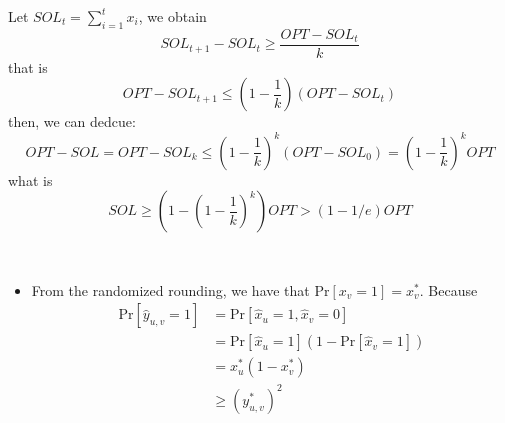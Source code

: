 \documentclass[12pt]{article}
\newenvironment{solution}[2][Solution]{\begin{trivlist}
\item[\hskip \labelsep {\bfseries #1}\hskip \labelsep {\bfseries #2.}]}{\end{trivlist}}
\begin{document}
\begin{solution}{1}
    Let $SOL_t = \sum_{i=1}^t x_i$, we obtain
    \[SOL_{t+1}-SOL_t \geq \frac{OPT-SOL_t}k\]
    that is
    \[OPT - SOL_{t+1} \le (1-\frac1k)(OPT-SOL_t)\]
    then, we can dedcue:
    \[OPT-SOL=OPT-SOL_k \le (1-\frac1k)^k(OPT-SOL_0)=(1-\frac1k)^kOPT\]
    what is
    \[SOL \geq (1-(1-\frac1k)^k)OPT > (1-1/e)OPT\]

\end{solution}

\begin{solution}{2}
    ~

    \begin{itemize}
        \item From the randomized rounding, we have that $\mathrm{Pr}[x_v = 1] = x_v^*$.
              Because
              \begin{align*}
                  \mathrm{Pr}[\hat{y}_{u,v}=1] & =\mathrm{Pr}[\hat{x}_u = 1, \hat{x}_v = 0]                \\
                                               & =\mathrm{Pr}[\hat{x}_u = 1](1-\mathrm{Pr}[\hat{x}_v = 1]) \\
                                               & =x_u^*(1-x_v^*)                                           \\
                                               & \ge (y_{u,v}^*)^2
              \end{align*}


\end{itemize}
\end{solution}
\end{document}
